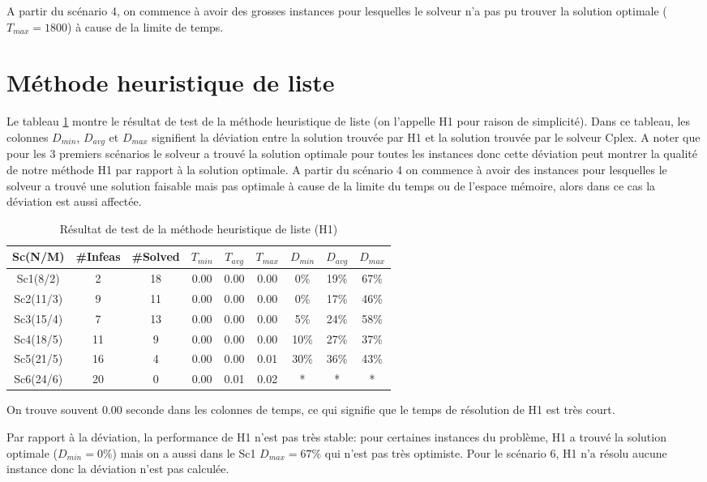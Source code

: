 \documentclass[twoside,fleqn]{EPURapport}
\begin{document}
A partir du scénario 4, on commence à avoir des grosses instances pour lesquelles le solveur n'a pas pu trouver la solution optimale ($T_{max}=1800$) à cause de la limite de temps.

\section{Méthode heuristique de liste}
Le tableau \ref{tab_h1} montre le résultat de test de la méthode heuristique de liste (on l'appelle H1 pour raison de simplicité). Dans ce tableau, les colonnes $D_{min}$, $D_{avg}$ et $D_{max}$ signifient la déviation entre la solution trouvée par H1 et la solution trouvée par le solveur Cplex. A noter que pour les 3 premiers scénarios le solveur a trouvé la solution optimale pour toutes les instances donc cette déviation peut montrer la qualité de notre méthode H1 par rapport à la solution optimale. A partir du scénario 4 on commence à avoir des instances pour lesquelles le solveur a trouvé une solution faisable mais pas optimale à cause de la limite du temps ou de l'espace mémoire, alors dans ce cas la déviation est aussi affectée.


\begin{table}[h]
    \centering
    \begin{tabular}{|c|c|c|c|c|c|c|c|c|}
    	\hline
    	Sc(N/M)	& \#Infeas & \#Solved	& $T_{min}$ & $T_{avg}$	& $T_{max}$ & $D_{min}$ & $D_{avg}$	& $D_{max}$ \\ \hline
		Sc1(8/2)  & 2 & 18 & 0.00 & 0.00 & 0.00 &0\% &19\% &67\% \\ \hline
Sc2(11/3) & 9 & 11 & 0.00 & 0.00 & 0.00 &0\% &17\% &46\% \\ \hline
Sc3(15/4) & 7 & 13 & 0.00 & 0.00 & 0.00 &5\% &24\% &58\% \\ \hline
Sc4(18/5) & 11 & 9 & 0.00 & 0.00 & 0.00 &10\%& 27\%& 37\% \\ \hline
Sc5(21/5) & 16 & 4 & 0.00 & 0.00 & 0.01 &30\%& 36\%& 43\% \\ \hline
Sc6(24/6) & 20 & 0 & 0.00 & 0.01 & 0.02 & * & * & * \\ \hline
    \end{tabular}
    \label{tab_h1}
    \caption{Résultat de test de la méthode heuristique de liste (H1)}
\end{table}
\bigskip

On trouve souvent 0.00 seconde dans les colonnes de temps, ce qui signifie que le temps de résolution de H1 est très court.


Par rapport à la déviation, la performance de H1 n'est pas très stable: pour certaines instances du problème, H1 a trouvé la solution optimale ($D_{min}=0\%$) mais on a aussi dans le Sc1 $D_{max}=67\%$ qui n'est pas très optimiste. Pour le scénario 6, H1 n'a résolu aucune instance donc la déviation n'est pas calculée.
\end{document}
